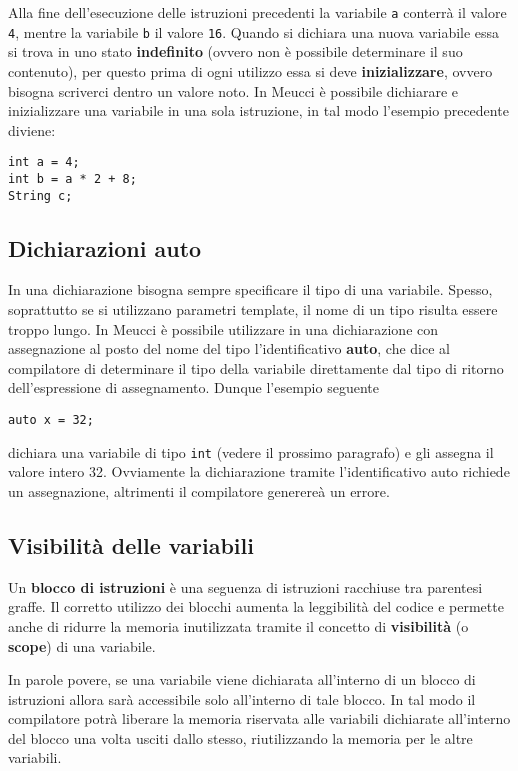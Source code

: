 \documentclass[10pt]{book}%
\newcommand{\e}{\`{e} }
\newcommand{\ac}[1]{\`{#1}}
\newcommand{\code}[1]{\texttt{#1}}
\renewcommand{\emph}[1]{\textbf{#1}}
\newenvironment{codeenv}{
\begin{mdframed}[backgroundcolor=black!20,topline=false,leftline=false,rightline=false,bottomline=false]
}
{\end{mdframed}}
\begin{document}
Alla fine dell'esecuzione delle istruzioni precedenti la variabile \code a conterr\ac a il valore \code 4, mentre la variabile \code b il valore \code{16}.
Quando si dichiara una nuova variabile essa si trova in uno stato \emph{indefinito} (ovvero non \e possibile determinare il suo contenuto), per questo prima di ogni utilizzo essa si deve \emph{inizializzare}, ovvero bisogna scriverci dentro un valore noto. In Meucci \e possibile dichiarare e inizializzare una variabile in una sola istruzione, in tal modo l'esempio precedente diviene:
\begin{codeenv}
\begin{verbatim}
int a = 4;
int b = a * 2 + 8;
String c;
\end{verbatim}
\end{codeenv}

\subsection{Dichiarazioni auto}
In una dichiarazione bisogna sempre specificare il tipo di una variabile. Spesso, soprattutto se si utilizzano parametri template, il nome di un tipo risulta essere troppo lungo. In Meucci \e possibile utilizzare in una dichiarazione con assegnazione al posto del nome del tipo l'identificativo \emph{auto}, che dice al compilatore di determinare il tipo della variabile direttamente dal tipo di ritorno dell'espressione di assegnamento. Dunque l'esempio seguente
\begin{codeenv}
\begin{verbatim}
auto x = 32;
\end{verbatim}
\end{codeenv}
dichiara una variabile di tipo \code{int} (vedere il prossimo paragrafo) e gli assegna il valore intero 32. Ovviamente la dichiarazione tramite l'identificativo auto richiede un assegnazione, altrimenti il compilatore generere\ac a un errore.

\subsection{Visibilit\ac a delle variabili}
Un \emph{blocco di istruzioni} \e una seguenza di istruzioni racchiuse tra parentesi graffe. Il corretto utilizzo dei blocchi aumenta la leggibilit\ac a del codice e permette anche di ridurre la memoria inutilizzata tramite il concetto di \emph{visibilit\ac a} (o \emph{scope}) di una variabile.

In parole povere, se una variabile viene dichiarata all'interno di un blocco di istruzioni allora sar\ac a accessibile solo all'interno di tale blocco. In tal modo il compilatore potr\ac a liberare la memoria riservata alle variabili dichiarate all'interno del blocco una volta usciti dallo stesso, riutilizzando la memoria per le altre variabili.
\end{document}
